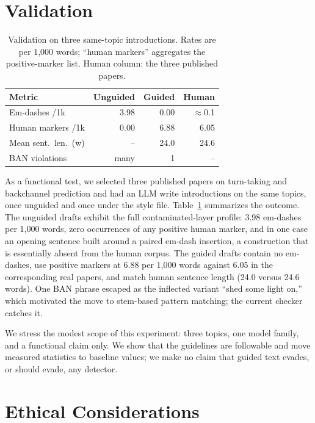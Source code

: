 \documentclass[a4paper,10pt,twocolumn]{article}
\begin{document}
\section{Validation}
\label{sec:validation}

\begin{table}[t]
  \caption{Validation on three same-topic introductions. Rates are per 1,000 words; ``human markers'' aggregates the positive-marker list. Human column: the three published papers.}
  \label{tab:validation}
  \centering
  \begin{tabular}{l r r r}
    \hline
    \textbf{Metric} & \textbf{Unguided} & \textbf{Guided} & \textbf{Human} \\
    \hline
    Em-dashes /1k        & 3.98 & 0.00 & $\approx$0.1 \\
    Human markers /1k    & 0.00 & 6.88 & 6.05 \\
    Mean sent.\ len.\ (w) & --  & 24.0 & 24.6 \\
    BAN violations       & many & 1    & --   \\
    \hline
  \end{tabular}
\end{table}

As a functional test, we selected three published papers on turn-taking and backchannel prediction and had an LLM write introductions on the same topics, once unguided and once under the style file. Table~\ref{tab:validation} summarizes the outcome. The unguided drafts exhibit the full contaminated-layer profile: 3.98 em-dashes per 1,000 words, zero occurrences of any positive human marker, and in one case an opening sentence built around a paired em-dash insertion, a construction that is essentially absent from the human corpus. The guided drafts contain no em-dashes, use positive markers at 6.88 per 1,000 words against 6.05 in the corresponding real papers, and match human sentence length (24.0 versus 24.6 words). One BAN phrase escaped as the inflected variant ``shed some light on,'' which motivated the move to stem-based pattern matching; the current checker catches it.

We stress the modest scope of this experiment: three topics, one model family, and a functional claim only. We show that the guidelines are followable and move measured statistics to baseline values; we make no claim that guided text evades, or should evade, any detector.

\section{Ethical Considerations}
\end{document}
